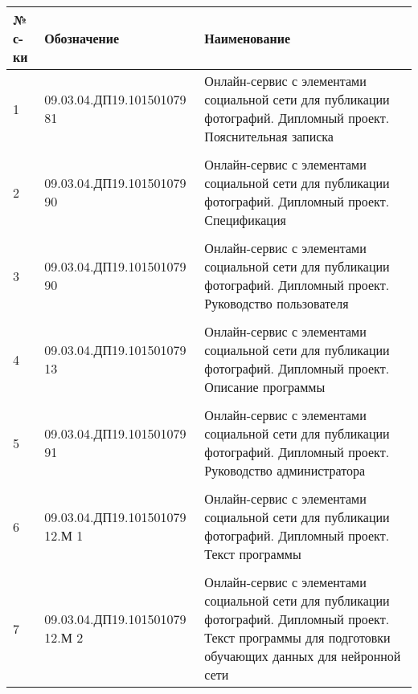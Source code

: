 \begin{table}[H]
  \begin{tabular}{|p{0.5cm}|p{5.5cm}|p{10cm}|}
  \hline № с-ки & Обозначение & Наименование \\
  \hline 1 & 09.03.04.ДП19.101501079 81 & Онлайн-сервис с элементами социальной сети для публикации фотографий. Дипломный проект. Пояснительная записка \\ 
   & & \\
  2 & 09.03.04.ДП19.101501079 90 & Онлайн-сервис с элементами социальной сети для публикации фотографий. Дипломный проект. Спецификация \\ 
   & & \\
  3 & 09.03.04.ДП19.101501079 90 & Онлайн-сервис с элементами социальной сети для публикации фотографий. Дипломный проект. Руководство пользователя \\ 
   & & \\
  4 & 09.03.04.ДП19.101501079 13 & Онлайн-сервис с элементами социальной сети для публикации фотографий. Дипломный проект. Описание программы \\ 
   & & \\
  5 & 09.03.04.ДП19.101501079 91 & Онлайн-сервис с элементами социальной сети для публикации фотографий. Дипломный проект. Руководство администратора \\ 
   & & \\
  6 & 09.03.04.ДП19.101501079 12.М 1 & Онлайн-сервис с элементами социальной сети для публикации фотографий. Дипломный проект. Текст программы \\ 
   & & \\
  7 & 09.03.04.ДП19.101501079 12.М 2 & Онлайн-сервис с элементами социальной сети для публикации фотографий. Дипломный проект. Текст программы для подготовки обучающих данных для нейронной сети \\
  \hline 
  \end{tabular}
\end{table}